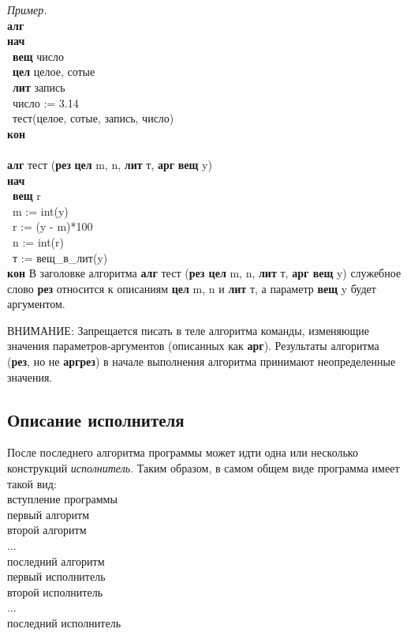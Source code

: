 \documentclass[12pt,a4paper]{article}
\newcommand{\otstup}{\textperiodcentered\ }
\begin{document}
	\emph{Пример.}\\
{\sffamily
\textbf{алг}\\
\textbf{нач}\\
\otstup \textbf{вещ} число\\
\otstup \textbf{цел} целое, сотые\\
\otstup \textbf{лит} запись\\
\otstup число := 3.14\\
\otstup тест(целое, сотые, запись, число)\\
\textbf{кон}\\
~\\
\textbf{алг} тест (\textbf{рез} \textbf{цел} m, n, \textbf{лит} т, \textbf{арг} \textbf{вещ} y)\\
\textbf{нач}\\
\otstup \textbf{вещ} r\\
\otstup m := int(y)\\
\otstup r := (y - m)*100\\
\otstup n := int(r)\\
\otstup т := вещ\_в\_лит(y)\\
\textbf{кон}
}
В заголовке алгоритма \textsf{\textbf{алг} тест (\textbf{рез цел} m, n, \textbf{лит} т, \textbf{арг вещ} y)} служебное слово \textbf{рез} относится к описаниям \textsf{\textbf{цел} m, n} и \textsf{\textbf{лит} т}, а параметр \textsf{\textbf{вещ} y} будет аргументом.

	ВНИМАНИЕ: Запрещается писать в теле алгоритма команды, изменяющие значения параметров-аргументов (описанных как \textbf{арг}). Результаты алгоритма (\textbf{рез}, но не \textbf{аргрез}) в начале выполнения алгоритма принимают неопределенные значения.

\subsection{Описание исполнителя}
\label{Isps}

После последнего алгоритма программы может идти одна или несколько конструкций \emph{исполнитель}. Таким образом, в самом общем виде программа имеет такой вид:
{\sffamily\\
вступление программы\\
первый алгоритм\\
второй алгоритм\\
...\\
последний алгоритм\\
первый исполнитель\\
второй исполнитель\\
...\\
последний исполнитель
}
\end{document}
